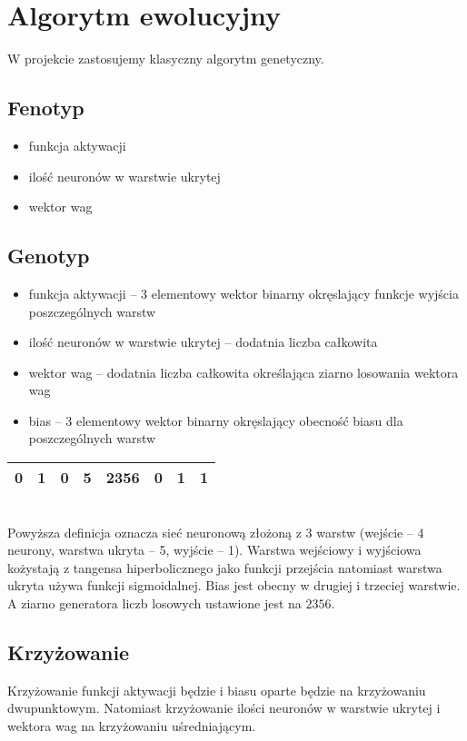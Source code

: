\documentclass{llncs}
\begin{document}
\section{Algorytm ewolucyjny}
W projekcie zastosujemy klasyczny algorytm genetyczny.
\subsection{Fenotyp}
\begin{itemize}
	\item funkcja aktywacji
	\item ilość neuronów w warstwie ukrytej
	\item wektor wag
\end{itemize}

\subsection{Genotyp}
\begin{itemize}
	\item funkcja aktywacji -- 3 elementowy wektor binarny okręslający funkcje wyjścia poszczególnych warstw
	\item ilość neuronów w warstwie ukrytej -- dodatnia liczba całkowita
	\item wektor wag -- dodatnia liczba całkowita określająca ziarno losowania wektora wag
	\item bias -- 3 elementowy wektor binarny okręslający obecność biasu dla poszczególnych warstw
\end{itemize}

\begin{example}

\begin{tabular}{ | c | c | c | c | c | c | c | c | }
	\hline
	0 & 1 & 0 & 5 & 2356 & 0 & 1 & 1\\
	\hline
\end{tabular}
\\
Powyższa definicja oznacza sieć neuronową złożoną z 3 warstw 
(wejście -- 4 neurony, warstwa ukryta -- 5, wyjście -- 1).
Warstwa wejściowy i wyjściowa kożystają z tangensa hiperbolicznego jako funkcji przejścia natomiast 
warstwa ukryta używa funkcji sigmoidalnej. Bias jest obecny w drugiej i trzeciej warstwie. A ziarno
generatora liczb losowych ustawione jest na $2356$.
\end{example}

\subsection{Krzyżowanie}
Krzyżowanie funkcji aktywacji będzie i biasu oparte będzie na krzyżowaniu dwupunktowym. Natomiast
krzyżowanie ilości neuronów w warstwie ukrytej i wektora wag na krzyżowaniu uśredniającym.
\end{document}
